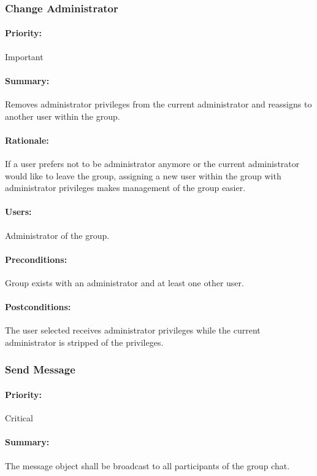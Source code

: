 \documentclass[11pt]{article}
\begin{document}
\subsubsection{Change Administrator} \label{UC-change-admin}
\paragraph{Priority:} Important
\paragraph{Summary:}
Removes administrator privileges from the current administrator and reassigns to another user within the group.
\paragraph{Rationale:}
If a user prefers not to be administrator anymore or the current administrator would like to leave the group, assigning a new user within the group with administrator privileges makes management of the group easier.
\paragraph{Users:}
Administrator of the group.
\paragraph{Preconditions:}
Group exists with an administrator and at least one other user.
\paragraph{{Postconditions:}}
The user selected receives administrator privileges while the current administrator is stripped of the privileges.

\subsubsection{Send Message} \label{UC-send-message}
\paragraph{Priority:} Critical
\paragraph{Summary:} The message object shall be broadcast to all participants of the group chat.
\end{document}

